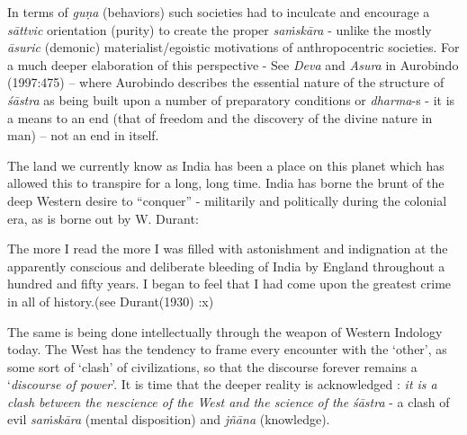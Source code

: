 In terms of {\sl guṇa} (behaviors) such societies had to inculcate and encourage a {\sl sāttvic} orientation (purity) to create the proper {\sl saṁskāra} - unlike the mostly {\sl āsuric} (demonic) materialist/egoistic motivations of anthropocentric societies. For a much deeper elaboration of this perspective - See {\sl Deva} and {\sl Asura} in Aurobindo (1997:475) -- where Aurobindo describes the essential nature of the structure of {\sl śāstra} as being built upon a number of preparatory conditions or {\sl dharma}-s - it is a means to an end (that of freedom and the discovery of the divine nature in man) – not an end in itself.

The land we currently know as India has been a place on this planet which has allowed this to transpire for a long, long time. India has borne the brunt of the deep Western desire to ``conquer'' - militarily and politically during the colonial era, as is borne out by W. Durant:
\begin{myquote}
The more I read the more I was filled with astonishment and indignation at the apparently conscious and deliberate bleeding of India by England throughout a hundred and fifty years. I began to feel that I had come upon the greatest crime in all of history.\hfill  (see Durant(1930) :x)
\end{myquote}
The same is being done intellectually through the weapon of Western Indology today. The West has the tendency to frame every encounter with the `other', as some sort of `clash' of civilizations, so that the discourse forever remains a `{\sl discourse of power}'. It is time that the deeper reality is acknowledged : {\sl it is a clash between the nescience of the West and the science of the} {{\sl śāstra}\relax} - a clash of evil {\sl saṁskāra} (mental disposition) and {\sl jñāna} (knowledge).

